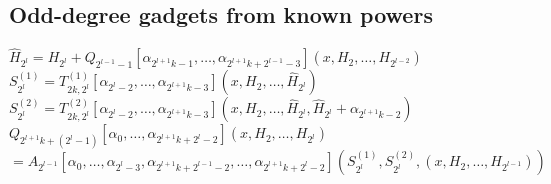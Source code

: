 \subsection{Odd-degree gadgets from known powers}
\begin{algorithm}[H]
    \caption{Odd-degree gadget $Q_{2^{l+1}k+(2^l-1)}$ from the known powers
        $(H_2,\ldots,H_{2^l})$, for $k\ge1$ and $l\ge2$.}
    \label{alg:constr-Q-odd}
      \begin{algorithmic}
          \State $\hat{H}_{2^l} = H_{2^l} + Q_{2^{l - 1} - 1}[\alpha_{2^{l + 1} k - 1}, \ldots, \alpha_{2^{l + 1}k + 2^{l - 1} - 3}](x, H_2, \ldots, H_{2^{l - 2}})$
          \State $S^{(1)}_{2^l} = T^{(1)}_{2 k, 2^{l}}[\alpha_{2^{l} - 2}, \ldots, \alpha_{2^{l + 1}k - 3}](x, H_2, \ldots, \hat{H}_{2^l})$
          \State $S^{(2)}_{2^l} = T^{(2)}_{2 k, 2^{l}}[\alpha_{2^{l} - 2}, \ldots, \alpha_{2^{l + 1}k - 3}](x, H_2, \ldots, \hat{H}_{2^l}, \hat{H}_{2^l} + \alpha_{2^{l + 1}k - 2})$
          \State $Q_{2^{l + 1}k + (2^l - 1)}[\alpha_0, \ldots, \alpha_{2^{l + 1}k + 2^l - 2}](x, H_2, \ldots, H_{2^l})$
          \Statex \hspace{\algorithmicindent}$= A_{2^{l-1}}[\alpha_0, \ldots, \alpha_{2^l - 3}, \alpha_{2^{l + 1}k + 2^{l - 1} - 2}, \ldots, \alpha_{2^{l + 1}k + 2^l - 2}](S^{(1)}_{2^l}, S^{(2)}_{2^l}, (x, H_2, \ldots, H_{2^{l-1}}))$
    \end{algorithmic}
\end{algorithm}

